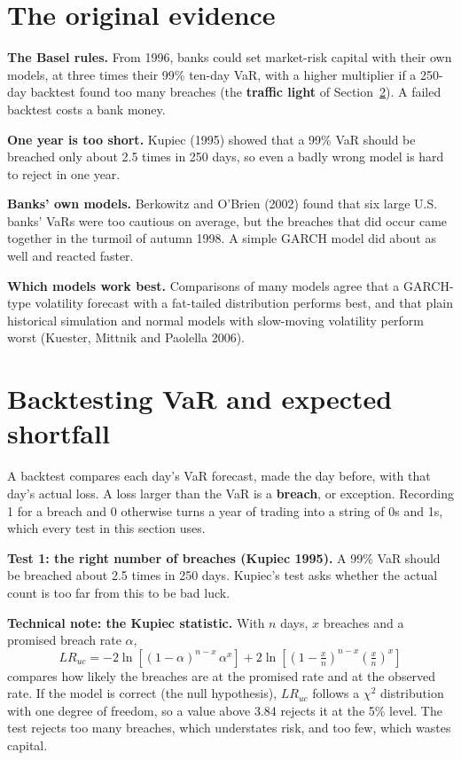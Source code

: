 \section{The original evidence}
\label{sec:11-evidence}

\textbf{The Basel rules.} From 1996, banks could set market-risk capital with their own models, at three times their 99\% ten-day VaR, with a higher multiplier if a 250-day backtest found too many breaches (the \textbf{traffic light} of Section~\ref{sec:11-backtest}). A failed backtest costs a bank money.

\textbf{One year is too short.} Kupiec (1995) showed that a 99\% VaR should be breached only about 2.5 times in 250 days, so even a badly wrong model is hard to reject in one year.

\textbf{Banks' own models.} Berkowitz and O'Brien (2002) found that six large U.S. banks' VaRs were too cautious on average, but the breaches that did occur came together in the turmoil of autumn 1998. A simple GARCH model did about as well and reacted faster.

\textbf{Which models work best.} Comparisons of many models agree that a GARCH-type volatility forecast with a fat-tailed distribution performs best, and that plain historical simulation and normal models with slow-moving volatility perform worst (Kuester, Mittnik and Paolella 2006).

\section{Backtesting VaR and expected shortfall}
\label{sec:11-backtest}

A backtest compares each day's VaR forecast, made the day before, with that day's actual loss. A loss larger than the VaR is a \textbf{breach}, or exception. Recording 1 for a breach and 0 otherwise turns a year of trading into a string of 0s and 1s, which every test in this section uses.

\textbf{Test 1: the right number of breaches (Kupiec 1995).} A 99\% VaR should be breached about 2.5 times in 250 days. Kupiec's test asks whether the actual count is too far from this to be bad luck.

\begin{technote}
\textbf{Technical note: the Kupiec statistic.} With $n$ days, $x$ breaches and a promised breach rate $\alpha$,
\begin{equation}
  LR_{uc} = -2\ln\!\left[(1 - \alpha)^{n-x}\,\alpha^{x}\right] + 2\ln\!\left[\left(1 - \tfrac{x}{n}\right)^{n-x}\left(\tfrac{x}{n}\right)^{x}\right]
  \label{eq:11-kupiec}
\end{equation}
compares how likely the breaches are at the promised rate and at the observed rate. If the model is correct (the null hypothesis), $LR_{uc}$ follows a $\chi^2$ distribution with one degree of freedom, so a value above 3.84 rejects it at the 5\% level. The test rejects too many breaches, which understates risk, and too few, which wastes capital.
\end{technote}

